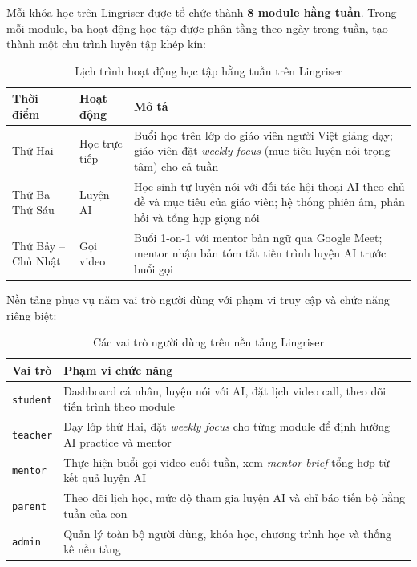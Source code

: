 Mỗi khóa học trên Lingriser được tổ chức thành \textbf{8 module hằng tuần}. Trong mỗi module, ba hoạt động học tập được phân tầng theo ngày trong tuần, tạo thành một chu trình luyện tập khép kín:

\begin{table}[H]
\centering
\begin{tabular}{|l|l|p{7.5cm}|}
\hline
\textbf{Thời điểm} & \textbf{Hoạt động} & \textbf{Mô tả} \\ \hline
Thứ Hai & Học trực tiếp & Buổi học trên lớp do giáo viên người Việt giảng dạy; giáo viên đặt \textit{weekly focus} (mục tiêu luyện nói trọng tâm) cho cả tuần \\ \hline
Thứ Ba -- Thứ Sáu & Luyện AI & Học sinh tự luyện nói với đối tác hội thoại AI theo chủ đề và mục tiêu của giáo viên; hệ thống phiên âm, phản hồi và tổng hợp giọng nói \\ \hline
Thứ Bảy -- Chủ Nhật & Gọi video & Buổi 1-on-1 với mentor bản ngữ qua Google Meet; mentor nhận bản tóm tắt tiến trình luyện AI trước buổi gọi \\ \hline
\end{tabular}
\caption{Lịch trình hoạt động học tập hằng tuần trên Lingriser}
\end{table}

Nền tảng phục vụ năm vai trò người dùng với phạm vi truy cập và chức năng riêng biệt:

\begin{table}[H]
\centering
\begin{tabular}{|l|p{9.5cm}|}
\hline
\textbf{Vai trò} & \textbf{Phạm vi chức năng} \\ \hline
\texttt{student} & Dashboard cá nhân, luyện nói với AI, đặt lịch video call, theo dõi tiến trình theo module \\ \hline
\texttt{teacher} & Dạy lớp thứ Hai, đặt \textit{weekly focus} cho từng module để định hướng AI practice và mentor \\ \hline
\texttt{mentor} & Thực hiện buổi gọi video cuối tuần, xem \textit{mentor brief} tổng hợp từ kết quả luyện AI \\ \hline
\texttt{parent} & Theo dõi lịch học, mức độ tham gia luyện AI và chỉ báo tiến bộ hằng tuần của con \\ \hline
\texttt{admin} & Quản lý toàn bộ người dùng, khóa học, chương trình học và thống kê nền tảng \\ \hline
\end{tabular}
\caption{Các vai trò người dùng trên nền tảng Lingriser}
\end{table}

